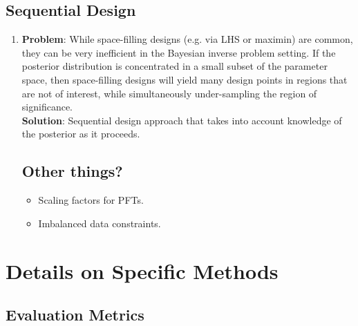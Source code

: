 \documentclass[12pt]{article}
\begin{document}
\subsection{Sequential Design}
\begin{enumerate}
\item \textbf{Problem}: While space-filling designs (e.g. via LHS or maximin) are common, they can be very inefficient in the Bayesian inverse problem setting. If the posterior distribution is concentrated in a small 
subset of the parameter space, then space-filling designs will yield many design points in regions that are not of interest, while simultaneously under-sampling the region of significance.  \\
	\textbf{Solution}: Sequential design approach that takes into account knowledge of the posterior as it proceeds. 
	
\subsection{Other things?}
\begin{itemize}
\item Scaling factors for PFTs. 
\item Imbalanced data constraints. 
\end{itemize}
	
\end{enumerate}

\section{Details on Specific Methods}

\subsection{Evaluation Metrics}
\end{document}
